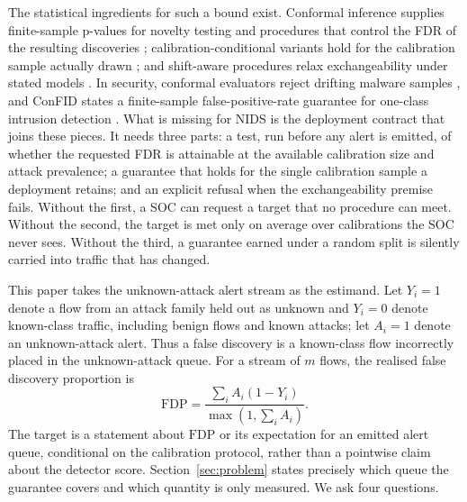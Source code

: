 \documentclass[a4paper,fleqn]{cas-dc}
\newcommand{\FDP}{\mathrm{FDP}}
\begin{document}
The statistical ingredients for such a bound exist. Conformal inference supplies finite-sample p-values for novelty testing and procedures that control the FDR of the resulting discoveries \cite{vovk2005algorithmic,bates2023outliers,aos2024adaptive,bashari2023derandomized}; calibration-conditional variants hold for the calibration sample actually drawn \cite{vovk2012conditional,bates2023outliers}; and shift-aware procedures relax exchangeability under stated models \cite{jrssb2024covshift,biomet2026weighted,neurips2025nonexchange}. In security, conformal evaluators reject drifting malware samples \cite{jordaney2017transcend,barbero2022transcending}, and ConFID states a finite-sample false-positive-rate guarantee for one-class intrusion detection \cite{farsimadan2026confid}. What is missing for NIDS is the deployment contract that joins these pieces. It needs three parts: a test, run before any alert is emitted, of whether the requested FDR is attainable at the available calibration size and attack prevalence; a guarantee that holds for the single calibration sample a deployment retains; and an explicit refusal when the exchangeability premise fails. Without the first, a SOC can request a target that no procedure can meet. Without the second, the target is met only on average over calibrations the SOC never sees. Without the third, a guarantee earned under a random split is silently carried into traffic that has changed.

This paper takes the unknown-attack alert stream as the estimand. Let $Y_i=1$ denote a flow from an attack family held out as unknown and $Y_i=0$ denote known-class traffic, including benign flows and known attacks; let $A_i=1$ denote an unknown-attack alert. Thus a false discovery is a known-class flow incorrectly placed in the unknown-attack queue. For a stream of $m$ flows, the realised false discovery proportion is
\begin{equation}
  \FDP=\frac{\sum_i A_i(1-Y_i)}{\max(1,\sum_i A_i)}.
\end{equation}
The target is a statement about $\FDP$ or its expectation for an emitted alert queue, conditional on the calibration protocol, rather than a pointwise claim about the detector score. Section~\ref{sec:problem} states precisely which queue the guarantee covers and which quantity is only measured. We ask four questions.
\end{document}
